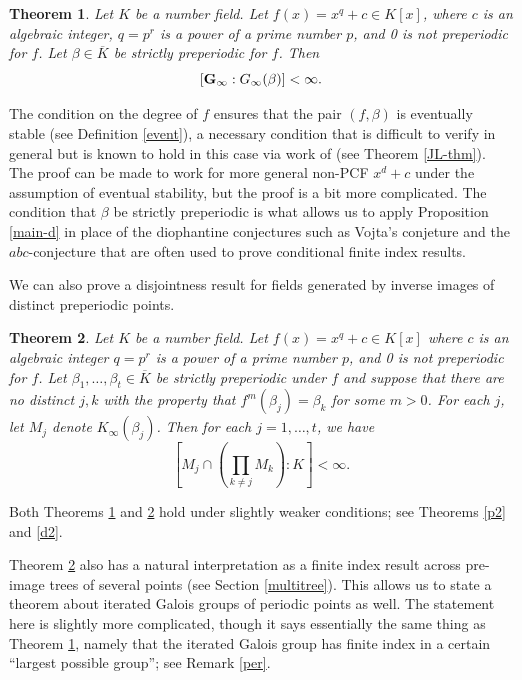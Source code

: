 \documentclass[11pt]{amsart}
\newtheorem{thm}{Theorem}
\theoremstyle{definition}
\theoremstyle{definition}
\numberwithin{thm}{section}
\numberwithin{equation}{thm}
\newcommand{\Kbar}{\ensuremath {\overline K}}
\begin{document}
\begin{thm}\label{p-theorem}
  Let $K$ be a number field.  Let $f(x) = x^q + c \in K[x]$, where $c$
  is an algebraic integer, $q = p^r$ is a power of a prime number
  $p$, and 0 is not preperiodic for $f$. Let $\beta\in \Kbar$ be strictly
  preperiodic for $f$.  Then
  \[ [{\bf G}_\infty: G_\infty(\beta)] < \infty. \]
\end{thm}


The condition on the degree of $f$ ensures that the pair $(f,\beta)$
is eventually stable (see Definition \ref{event}), a necessary
condition that is difficult to verify in general but is known to hold
in this case via work of \cite{RafeAlon} (see Theorem \ref{JL-thm}).
The proof can be made to work for more general non-PCF $x^d + c$ under
the assumption of eventual stability, but the proof is a bit more
complicated.  The condition that $\beta$ be strictly preperiodic is
what allows us to apply Proposition \ref{main-d} in place of the
diophantine conjectures such as Vojta's conjeture and the
$abc$-conjecture that are often used to prove conditional finite index
results.

We can also prove a disjointness result for fields generated by
inverse images of distinct preperiodic points.

\begin{thm}\label{disjoint-theorem} Let $K$ be a number field.  Let $f(x) = x^q + c \in K[x]$ where $c$
  is an algebraic integer $q = p^r$ is a power of a prime number $p$,
  and 0 is not preperiodic for $f$.  Let $\beta_1, \dots, \beta_t \in \Kbar$ be
  strictly preperiodic under $f$ and suppose that there are no
  distinct $j, k$ with the property that $f^m(\beta_j) = \beta_k$ for
  some $m >0$.  For each $j$, let $M_j$ denote $K_\infty(\beta_j)$.
  Then for each $j=1,\dots, t$, we have 
\[ \left[M_j \cap \left(\prod_{k \ne j} M_k\right): K\right] < \infty .\]
\end{thm}

Both Theorems \ref{p-theorem} and \ref{disjoint-theorem} hold under
slightly weaker conditions; see Theorems \ref{p2} and \ref{d2}.  

Theorem \ref{disjoint-theorem} also has a natural interpretation as a finite
index result across pre-image trees of several points (see Section
\ref{multitree}). This allows us to state a theorem about iterated
Galois groups of periodic points as well.  The statement here is
slightly more complicated, though it says essentially the same thing
as Theorem \ref{p-theorem},
namely that the iterated Galois group has finite index in a certain
``largest possible group''; see Remark \ref{per}.
\end{document}
